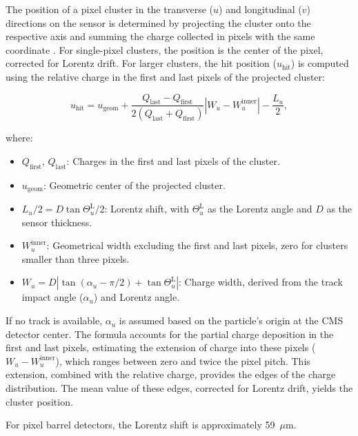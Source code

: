 The position of a pixel cluster in the transverse (\(u\)) and longitudinal (\(v\)) directions on the sensor is determined by projecting the cluster onto the respective axis and summing the charge collected in pixels with the same coordinate \cite{Tracking_2014}. For single-pixel clusters, the position is the center of the pixel, corrected for Lorentz drift. For larger clusters, the hit position (\(u_{\text{hit}}\)) is computed using the relative charge in the first and last pixels of the projected cluster:

\begin{equation}
u_{\text{hit}} = u_{\text{geom}} + \frac{Q_{\text{last}} - Q_{\text{first}}}{2(Q_{\text{last}} + Q_{\text{first}})} |W_u - W_u^{\text{inner}}| - \frac{L_u}{2},
\end{equation}

where:
\begin{itemize}
    \item \(Q_{\text{first}}\), \(Q_{\text{last}}\): Charges in the first and last pixels of the cluster.
    \item \(u_{\text{geom}}\): Geometric center of the projected cluster.
    \item \(L_u/2 = D \tan \Theta_u^{\text{L}}/2\): Lorentz shift, with \(\Theta_u^{\text{L}}\) as the Lorentz angle and \(D\) as the sensor thickness.
    \item \(W_u^{\text{inner}}\): Geometrical width excluding the first and last pixels, zero for clusters smaller than three pixels.
    \item \(W_u = D \left| \tan (\alpha_u - \pi/2) + \tan \Theta_u^{\text{L}} \right|\): Charge width, derived from the track impact angle (\(\alpha_u\)) and Lorentz angle.
\end{itemize}

If no track is available, \(\alpha_u\) is assumed based on the particle's origin at the CMS detector center. The formula accounts for the partial charge deposition in the first and last pixels, estimating the extension of charge into these pixels (\(W_u - W_u^{\text{inner}}\)), which ranges between zero and twice the pixel pitch. This extension, combined with the relative charge, provides the edges of the charge distribution. The mean value of these edges, corrected for Lorentz drift, yields the cluster position.

For pixel barrel detectors, the Lorentz shift is approximately 59~\(\mu\)m.

